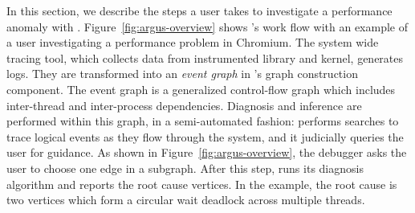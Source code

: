 In this section, we describe the steps a user takes to investigate a performance
anomaly with \xxx. Figure~\ref{fig:argus-overview} shows \xxx's work flow with
an example of a user investigating a performance problem in Chromium. The
system wide tracing tool, which collects data from \xxx instrumented library
and kernel, generates logs. They are transformed into an \emph{event graph} in \xxx's graph
construction component. The event graph is a
generalized control-flow graph which includes inter-thread and inter-process
dependencies. Diagnosis and inference are performed within this graph, in a
semi-automated fashion: \xxx performs searches to trace logical events as they
flow through the system, and it judicially queries the user for guidance.
As shown in Figure~\ref{fig:argus-overview}, the \xxx debugger asks the user to choose
one edge in a subgraph. After this step, \xxx runs its diagnosis algorithm and
reports the root cause vertices. In the example, the root cause is two vertices
which form a circular wait deadlock across multiple threads.
%
%

